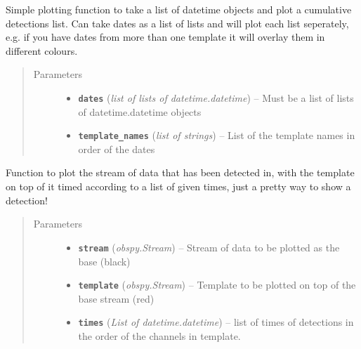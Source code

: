 \documentclass[a4paper,10pt,english]{sphinxmanual}
\begin{document}
\begin{fulllineitems}
\label{utils:EQcorrscan_plotting.cumulative_detections}
Simple plotting function to take a list of datetime objects and plot
a cumulative detections list.  Can take dates as a list of lists and will
plot each list seperately, e.g. if you have dates from more than one
template it will overlay them in different colours.
\begin{quote}\begin{description}
\item[{Parameters}] \leavevmode\begin{itemize}
\item {} 
\textbf{\texttt{dates}} (\emph{list of lists of datetime.datetime}) -- Must be a list of lists of datetime.datetime objects

\item {} 
\textbf{\texttt{template\_names}} (\emph{list of strings}) -- List of the template names in order of the dates

\end{itemize}

\end{description}\end{quote}

\end{fulllineitems}


\begin{fulllineitems}
\label{utils:EQcorrscan_plotting.detection_multiplot}
Function to plot the stream of data that has been detected in, with the
template on top of it timed according to a list of given times, just a
pretty way to show a detection!
\begin{quote}\begin{description}
\item[{Parameters}] \leavevmode\begin{itemize}
\item {} 
\textbf{\texttt{stream}} (\emph{obspy.Stream}) -- Stream of data to be plotted as the base (black)

\item {} 
\textbf{\texttt{template}} (\emph{obspy.Stream}) -- Template to be plotted on top of the base stream (red)

\item {} 
\textbf{\texttt{times}} (\emph{List of datetime.datetime}) -- list of times of detections in the order of the channels in
template.

\end{itemize}

\end{description}\end{quote}

\end{fulllineitems}
\end{document}
